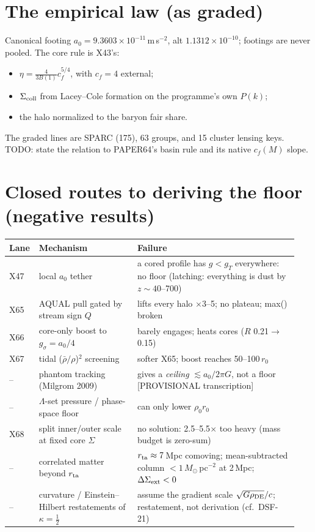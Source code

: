 \documentclass[10pt]{article}
\begin{document}
\section{The empirical law (as graded)}
Canonical footing $a_0=9.3603\times10^{-11}$\,m\,s$^{-2}$, alt $1.1312\times10^{-10}$; footings are never pooled. The core rule is X43's:
\begin{itemize}
\item $\eta=\tfrac{4}{3B(1)}c_f^{5/4}$, with $c_f=4$ external;
\item $\Sigma_{\rm coll}$ from Lacey--Cole formation on the programme's own $P(k)$;
\item the halo normalized to the baryon fair share.
\end{itemize}
The graded lines are SPARC (175), 63 groups, and 15 cluster lensing keys. TODO: state the relation to PAPER64's basin rule and its native $c_f(M)$ slope.

\section{Closed routes to deriving the floor (negative results)}
\begin{tabular}{@{}p{0.07\linewidth}p{0.33\linewidth}p{0.54\linewidth}@{}}\toprule
Lane & Mechanism & Failure \\\midrule
X47 & local $a_0$ tether & a cored profile has $g<g_T$ everywhere: no floor (latching: everything is dust by $z\sim40$--700)\\
X65 & AQUAL pull gated by stream sign $Q$ & lifts every halo $\times3$--5; no plateau; max() broken\\
X66 & core-only boost to $g_\sigma=a_0/4$ & barely engages; heats cores ($R$ 0.21$\to$0.15)\\
X67 & tidal ($\bar\rho/\rho$)$^2$ screening & softer X65; boost reaches 50--100\,$r_0$\\
-- & phantom tracking (Milgrom 2009) & gives a \emph{ceiling} $\lesssim a_0/2\pi G$, not a floor [PROVISIONAL transcription]\\
-- & $\Lambda$-set pressure / phase-space floor & can only lower $\rho_0r_0$\\
X68 & split inner/outer scale at fixed core $\Sigma$ & no solution: 2.5--5.5$\times$ too heavy (mass budget is zero-sum)\\
-- & correlated matter beyond $r_{\rm ta}$ & $r_{\rm ta}\approx7$\,Mpc comoving; mean-subtracted column $<1\,M_\odot$\,pc$^{-2}$ at 2\,Mpc; $\Delta\Sigma_{\rm ext}<0$\\
-- & curvature / Einstein--Hilbert restatements of $\kappa=\tfrac12$ & assume the gradient scale $\sqrt{G\rho_{\rm DE}}/c$; restatement, not derivation (cf.\ DSF-21)\\\bottomrule
\end{tabular}
\end{document}
